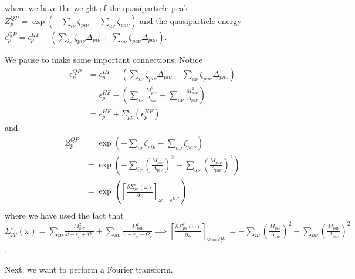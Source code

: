 where we have the weight of the quasiparticle peak $Z_p^{QP} = \exp\left(-\sum_{i\nu} \zeta_{pi\nu} - \sum_{a\nu} \zeta_{pa\nu}\right)$ and the quasiparticle energy $\epsilon_p^{QP} = \epsilon_p^{HF} - \left(\sum_{i\nu} \zeta_{pi\nu} \Delta_{pi\nu} + \sum_{a\nu} \zeta_{pa\nu} \Delta_{pa\nu}\right)$. 
\begin{tcolorbox}
We pause to make some important connections. Notice
\begin{align}
\epsilon_p^{QP} & = \epsilon_p^{HF} - \left(\sum_{i\nu} \zeta_{pi\nu} \Delta_{pi\nu} + \sum_{a\nu} \zeta_{pa\nu} \Delta_{pa\nu}\right) \\
& = \epsilon_p^{HF} - \left(\sum_{i\nu} \frac{M_{pi\nu}^2}{\Delta_{pi\nu}} + \sum_{a\nu} \frac{M_{pa\nu}^2}{\Delta_{pa\nu}}\right) \\
& = \epsilon_p^{HF} + \Sigma_{pp}^c\left(\epsilon_p^{HF}\right)
\end{align}
and
\begin{align}
Z_p^{QP} & = \exp\left(-\sum_{i\nu} \zeta_{pi\nu} - \sum_{a\nu} \zeta_{pa\nu}\right) \\
& = \exp\left(-\sum_{i\nu} \left(\frac{M_{pi\nu}}{\Delta_{pi\nu}}\right)^2 - \sum_{a\nu} \left(\frac{M_{pa\nu}}{\Delta_{pa\nu}}\right)^2\right) \\
& = \exp\left(\left[\frac{\partial \Sigma_{pp}^c(\omega)}{\partial \omega}\right]_{\omega = \epsilon_p^{HF}}\right) \\
\end{align}
where we have used the fact that $\Sigma_{pp}^c(\omega) = \sum_{i\nu} \frac{M_{pi\nu}^2}{\omega - \epsilon_i + \Omega_\nu} + \sum_{a\nu} \frac{M_{pa\nu}^2}{\omega - \epsilon_a - \Omega_\nu} \implies \left[\frac{\partial \Sigma_{pp}^c(\omega)}{\partial \omega}\right]_{\omega = \epsilon_p^{HF}} = -\sum_{i\nu} \left(\frac{M_{pi\nu}}{\Delta_{pi\nu}}\right)^2 - \sum_{a\nu} \left(\frac{M_{pa\nu}}{\Delta_{pa\nu}}\right)^2$.
\end{tcolorbox}
Next, we want to perform a Fourier transform.
